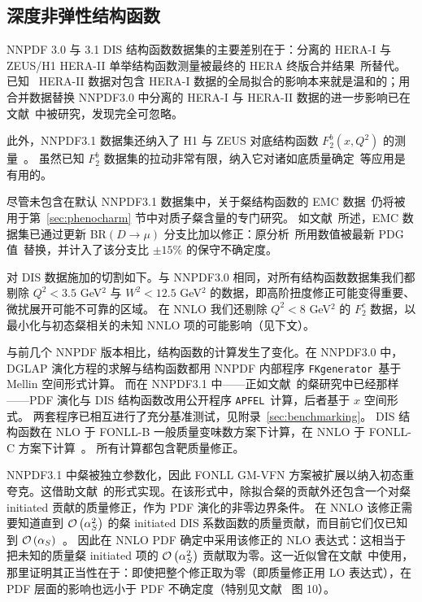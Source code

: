 \clearpage

\subsection{深度非弹性结构函数}
\label{sec:datadis}

NNPDF 3.0 与 3.1 DIS 结构函数数据集的主要差别在于：分离的 HERA-I 与 ZEUS/H1 HERA-II 单举结构函数测量被最终的 HERA 终版合并结果~\cite{Abramowicz:2015mha}所替代。已知~\cite{Ball:2014uwa,Thorne:2015caa,Hou:2016nqm,Harland-Lang:2016yfn} HERA-II 数据对包含 HERA-I 数据的全局拟合的影响本来就是温和的；用合并数据替换 NNPDF3.0 中分离的 HERA-I 与 HERA-II 数据的进一步影响已在文献~\cite{Rojo:2015nxa}中被研究，发现完全可忽略。

%
此外，NNPDF3.1 数据集还纳入了 H1 与 ZEUS 对底结构函数 $F_2^b(x,Q^2)$ 的测量~\cite{Aaron:2009af,Abramowicz:2014zub}。
%
虽然已知 $F_2^b$ 数据集的拉动非常有限，纳入它对诸如底质量确定~\cite{Harland-Lang:2015qea}等应用是有用的。

尽管未包含在默认 NNPDF3.1 数据集中，关于粲结构函数的 EMC 数据~\cite{Aubert:1982tt}仍将被用于第~\ref{sec:phenocharm} 节中对质子粲含量的专门研究。
%
如文献~\cite{Ball:2016neh,Rottoli:2016lsg}所述，EMC 数据集已通过更新 BR$(D\to \mu)$ 分支比加以修正：原分析~\cite{Aubert:1982tt}所用数值被最新 PDG 值~\cite{Olive:2016xmw}替换，并计入了该分支比 $\pm 15\%$ 的保守不确定度。


对 DIS 数据施加的切割如下。与 NNPDF3.0 相同，对所有结构函数数据集我们都剔除
$Q^2 < 3.5$ GeV$^2$ 与 $W^2< 12.5$ GeV$^2$ 的数据，即高阶扭度修正可能变得重要、微扰展开可能不可靠的区域。
在 NNLO 我们还剔除 $Q^2 < 8$ GeV$^2$ 的 $F_2^c$ 数据，以最小化与初态粲相关的未知 NNLO 项的可能影响（见下文）。

与前几个 NNPDF 版本相比，结构函数的计算发生了变化。在 NNPDF3.0 中，DGLAP 演化方程的求解与结构函数都用 NNPDF 内部程序 {\tt FKgenerator}~\cite{Ball:2008by,Ball:2010de}基于 Mellin 空间形式计算。
%
而在 NNPDF3.1 中——正如文献~\cite{Ball:2016neh}的粲研究中已经那样——PDF 演化与 DIS 结构函数改用公开程序 {\tt APFEL}~\cite{Bertone:2013vaa}计算，后者基于 $x$ 空间形式。
%
两套程序已相互进行了充分基准测试，见附录~\ref{sec:benchmarking}。
%
DIS 结构函数在 NLO 于 FONLL-B 一般质量变味数方案下计算，在 NNLO 于 FONLL-C 方案下计算~\cite{Forte:2010ta}。
%
所有计算都包含靶质量修正。

NNPDF3.1 中粲被独立参数化，因此 FONLL GM-VFN 方案被扩展以纳入初态重夸克。这借助文献~\cite{Ball:2015tna,Ball:2015dpa}的形式实现。在该形式中，除拟合粲的贡献外还包含一个对粲 initiated 贡献的质量修正，作为 PDF 演化的非零边界条件。
 在 NNLO 该修正需要知道直到 $\mathcal{O}\left( \alpha_S^2\right)$ 的粲 initiated DIS 系数函数的质量贡献，而目前它们仅已知到 $\mathcal{O}\left( \alpha_S\right)$~\cite{Kretzer:1998ju}。
%
因此在 NNLO PDF 确定中采用该修正的 NLO 表达式：这相当于把未知的质量粲 initiated 项的 $\mathcal{O}\left( \alpha^2_S\right)$ 贡献取为零。这一近似曾在文献~\cite{Ball:2016neh}中使用，那里证明其正当性在于：即使把整个修正取为零（即质量修正用 LO 表达式），在 PDF 层面的影响也远小于 PDF 不确定度（特别见文献~\cite{Ball:2016neh} 图 10）。


